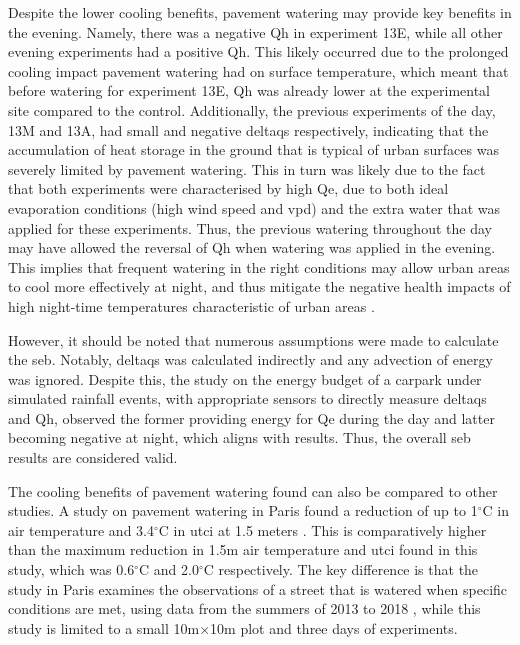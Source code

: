 \documentclass[final,3p,times,authoryear]{elsarticle}
\begin{document}
Despite the lower cooling benefits, pavement watering may provide key benefits in the evening. Namely, there was a negative \gls{Qh} in experiment 13E, while all other evening experiments had a positive \gls{Qh}. This likely occurred due to the prolonged cooling impact pavement watering had on surface temperature, which meant that before watering for experiment 13E, \gls{Qh} was already lower at the experimental site compared to the control. Additionally, the previous experiments of the day, 13M and 13A, had small and negative \gls{deltaqs} respectively, indicating that the accumulation of heat storage in the ground that is typical of urban surfaces \citep{Oke1982,Anandakumar1999} was severely limited by pavement watering. This in turn was likely due to the fact that both experiments were characterised by high \gls{Qe}, due to both ideal evaporation conditions (high wind speed and \gls{vpd}) and the extra water that was applied for these experiments. Thus, the previous watering throughout the day may have allowed the reversal of \gls{Qh} when watering was applied in the evening. This implies that frequent watering in the right conditions may allow urban areas to cool more effectively at night, and thus mitigate the negative health impacts of high night-time temperatures characteristic of urban areas \citep{Clarke1972,Coutts2010}.

However, it should be noted that numerous assumptions were made to calculate the \gls{seb}. Notably, \gls{deltaqs} was calculated indirectly and any advection of energy was ignored. Despite this, the \cite{Cohard2018} study on the energy budget of a carpark under simulated rainfall events, with appropriate sensors to directly measure \gls{deltaqs} and \gls{Qh}, observed the former providing energy for \gls{Qe} during the day and latter becoming negative at night, which aligns with results. Thus, the overall \gls{seb} results are considered valid.

The cooling benefits of pavement watering found can also be compared to other studies. A study on pavement watering in Paris found a reduction of up to 1$^{\circ}$C in air temperature and 3.4$^{\circ}$C in \gls{utci} at 1.5 meters \citep{Parison2020}. This is comparatively higher than the maximum reduction in 1.5m air temperature and \gls{utci} found in this study, which was 0.6$^{\circ}$C and 2.0$^{\circ}$C respectively. The key difference is that the study in Paris examines the observations of a street that is watered when specific conditions are met, using data from the summers of 2013 to 2018 \citep{Parison2020}, while this study is limited to a small 10m$\times$10m plot and three days of experiments.
\end{document}
